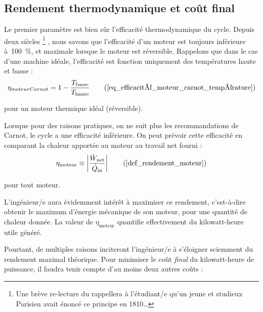 	\subsection{Rendement thermodynamique et coût final}

		Le premier paramètre est bien sûr l’efficacité thermodynamique du cycle. Depuis deux siècles%
			\footnote{Une brève re-lecture du \courssept rappellera à l’étudiant/e qu’un jeune et studieux Parisien avait énoncé ce principe en 1810…}%
			, nous savons que l’efficacité d’un moteur est toujours inférieure à~\SI{100}{\percent}, et maximale lorsque le moteur est réversible. Rappelons que dans le cas d’une machine idéale, l’efficacité est fonction uniquement des températures haute et basse :
		\begin{equation}
			\eta _{moteurCarnot} = 1 - \frac{T_\text{basse}}{T_\text{haute}}	\tag{\ref{eq_efficacité_moteur_carnot_température}}
		\end{equation}

		\begin{equationterms}
			\item pour un moteur thermique idéal (réversible).
		\end{equationterms}

		Lorsque pour des raisons pratiques, on ne suit plus les recommandations de Carnot, le cycle a une efficacité inférieure. On peut prévoir cette efficacité en comparant la chaleur apportée au moteur au travail net fourni :
		\begin{equation}
			\eta_\text{moteur} \equiv \left| \frac{\dot{W}_\text{net}}{\dot{Q}_\text{in}} \right| \tag{\ref{def_rendement_moteur}}
		\end{equation}

		\begin{equationterms}
			\item pour tout moteur.
		\end{equationterms}

		L’ingénieur/e aura évidemment intérêt à maximiser ce rendement, c’est-à-dire obtenir le maximum d’énergie mécanique de son moteur, pour une quantité de chaleur donnée. La valeur de $\eta_\text{moteur}$  quantifie effectivement  du kilowatt-heure utile généré.

		Pourtant, de multiples raisons inciteront l’ingénieur/e à s’éloigner sciemment du rendement maximal théorique. Pour minimiser le coût \emph{final} du kilowatt-heure de puissance, il faudra tenir compte d’au moins deux autres coûts :

